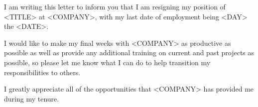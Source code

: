 \documentclass[10pt,stdletter,dateno]{newlfm}
\begin{document}
\begin{newlfm}

I am writing this letter to inform you that I am resigning my position of <TITLE> at <COMPANY>, with my last date of employment being <DAY> the <DATE>.

I would like to make my final weeks with <COMPANY> as productive as possible as well as provide any additional training on current and past projects as possible, so please let me know what I can do to help transition my responsibilities to others.

I greatly appreciate all of the opportunities that <COMPANY> has provided me during my tenure.

\end{newlfm}

\end{document}
